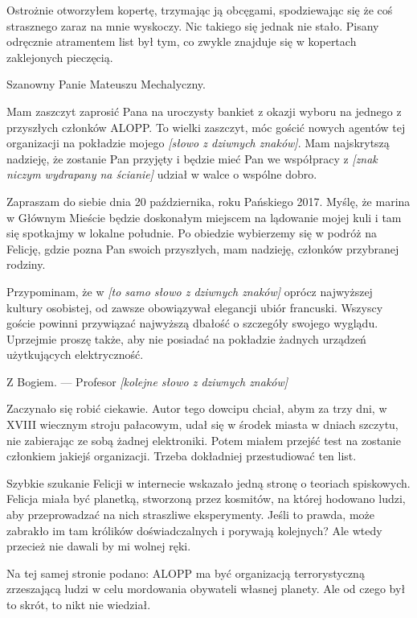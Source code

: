 Ostrożnie otworzyłem kopertę, trzymając ją obcęgami, spodziewając się że coś strasznego zaraz na mnie wyskoczy.
Nic takiego się jednak nie stało.
Pisany odręcznie atramentem list był tym, co zwykle znajduje się w kopertach zaklejonych pieczęcią.

\begin{em}
Szanowny Panie Mateuszu Mechalyczny.

Mam zaszczyt zaprosić Pana na uroczysty bankiet z okazji wyboru na jednego z przyszłych członków ALOPP.
To wielki zaszczyt, móc gościć nowych agentów tej organizacji na pokładzie mojego \emph{[słowo z dziwnych znaków]}.
Mam najskrytszą nadzieję, że zostanie Pan przyjęty i będzie mieć Pan we współpracy z \emph{[znak niczym wydrapany na ścianie]} udział w walce o wspólne dobro.

Zapraszam do siebie dnia 20 października, roku Pańskiego 2017.
Myślę, że marina w Głównym Mieście będzie doskonałym miejscem na lądowanie mojej kuli i tam się spotkajmy w lokalne południe.
Po obiedzie wybierzemy się w podróż na Felicję, gdzie pozna Pan swoich przyszłych, mam nadzieję, członków przybranej rodziny.

Przypominam, że w \emph{[to samo słowo z dziwnych znaków]} oprócz najwyższej kultury osobistej,
od zawsze obowiązywał elegancji ubiór francuski.
Wszyscy goście powinni przywiązać najwyższą dbałość o szczegóły swojego wyglądu.
Uprzejmie proszę także, aby nie posiadać na pokładzie żadnych urządzeń użytkujących elektryczność.

Z Bogiem.
--- Profesor \emph{[kolejne słowo z dziwnych znaków]}
\end{em}

Zaczynało się robić ciekawie. Autor tego dowcipu chciał, abym za trzy dni, w XVIII wiecznym stroju pałacowym,
udał się w środek miasta w dniach szczytu, nie zabierając ze sobą żadnej elektroniki.
Potem miałem przejść test na zostanie członkiem jakiejś organizacji.
Trzeba dokładniej przestudiować ten list.

Szybkie szukanie Felicji w internecie wskazało jedną stronę o teoriach spiskowych.
Felicja miała być planetką, stworzoną przez kosmitów, na której hodowano ludzi, aby przeprowadzać na nich straszliwe eksperymenty.
Jeśli to prawda, może zabrakło im tam królików doświadczalnych i porywają kolejnych?
Ale wtedy przecież nie dawali by mi wolnej ręki.

Na tej samej stronie podano: ALOPP ma być organizacją terrorystyczną zrzeszającą ludzi w celu mordowania obywateli własnej planety.
Ale od czego był to skrót, to nikt nie wiedział.

